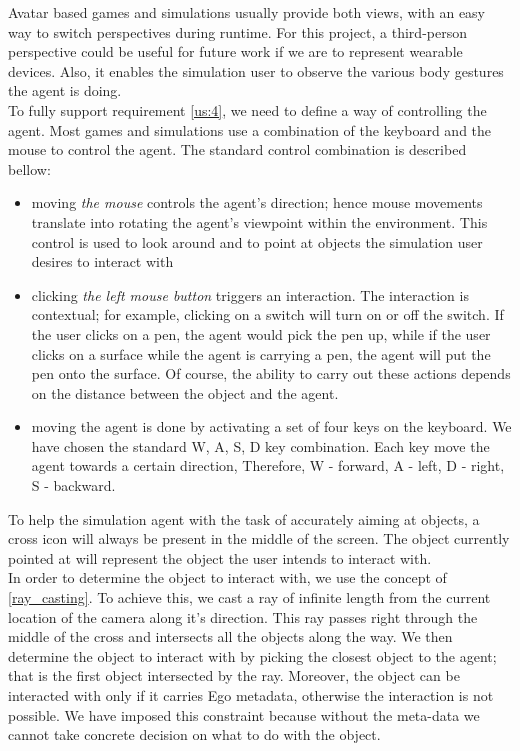 Avatar based games and simulations usually provide both views, with an easy way to switch perspectives during runtime. For this project, a third-person perspective could be useful for future work if we are to represent wearable devices. Also, it enables the simulation user to observe the various body gestures the agent is doing.\\

To fully support requirement \ref{us:4}, we need to define a way of controlling the agent. Most games and simulations use a combination of the keyboard and the mouse to control the agent. The standard control combination is described bellow:
\begin{itemize}
	\item moving \emph{the mouse} controls the agent's direction; hence mouse movements translate into rotating the agent's viewpoint within the environment. This control is used to look around and to point at objects the simulation user desires to interact with
	\item clicking \emph{the left mouse button} triggers an interaction. The interaction is contextual; for example, clicking on a switch will turn on or off the switch. If the user clicks on a pen, the agent would pick the pen up, while if the user clicks on a surface while the agent is carrying a pen, the agent will put the pen onto the surface. Of course, the ability to carry out these actions depends on the distance between the object and the agent.
	\item moving the agent is done by activating a set of four keys on the keyboard. We have chosen the standard W, A, S, D key combination. Each key move the agent towards a certain direction, Therefore, W - forward, A - left, D - right, S - backward.
\end{itemize}

To help the simulation agent with the task of accurately aiming at objects, a cross icon will always be present in the middle of the screen. The object currently pointed at will represent the object the user intends to interact with.\\

In order to determine the object to interact with, we use the concept of \ref{ray_casting}. To achieve this, we cast a ray of infinite length from the current location of the camera along it's direction. This ray passes right through the middle of the cross and intersects all the objects along the way. We then determine the object to interact with by picking the closest object to the agent; that is the first object intersected by the ray. Moreover, the object can be interacted with only if it carries Ego metadata, otherwise the interaction is not possible. We have imposed this constraint because without the meta-data we cannot take concrete decision on what to do with the object.\\


